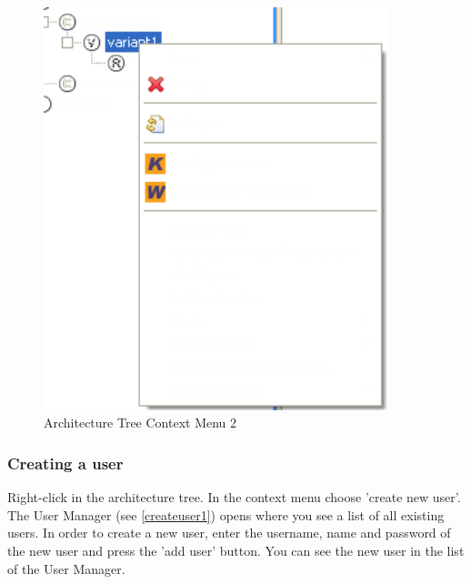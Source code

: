 \begin{figure}[h!]
\begin{center}
\includegraphics[width=10cm]{rolekontext2.png}
   \caption{Architecture Tree Context Menu 2}
\label{rolekontext2}
\end{center}
\end{figure}\par


\subsubsection{Creating a user}

Right-click in the architecture tree. In the context menu choose
'create new user'. The User Manager (see \ref{createuser1}) opens where you see a list of all existing users.
In order to create a new user, enter the username, name and password of the new user and press the 'add user' button.
You
can see the new user in the list of the User Manager.

